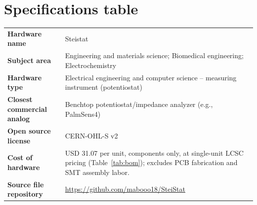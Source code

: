 \section*{Specifications table}
\label{sec:specifications}

\begin{table}[H]
\centering
\footnotesize
\renewcommand{\arraystretch}{1.3}
\begin{tabular}{@{}p{3.2cm}p{10.5cm}@{}}
\toprule
\textbf{Hardware name} & Steistat \\
\textbf{Subject area} & Engineering and materials science; Biomedical engineering; Electrochemistry \\
\textbf{Hardware type} & Electrical engineering and computer science -- measuring instrument (potentiostat) \\
\textbf{Closest commercial analog} & Benchtop potentiostat/impedance analyzer (e.g., PalmSens4) \\
\textbf{Open source license} & CERN-OHL-S v2 \\
\textbf{Cost of hardware} & USD \SI{31.07}{} per unit, components only, at single-unit LCSC pricing (Table~\ref{tab:bom}); excludes PCB fabrication and SMT assembly labor. %
 \\
\textbf{Source file repository} & \url{https://github.com/mabooo18/SteiStat} \\
\bottomrule
\end{tabular}
\end{table}
